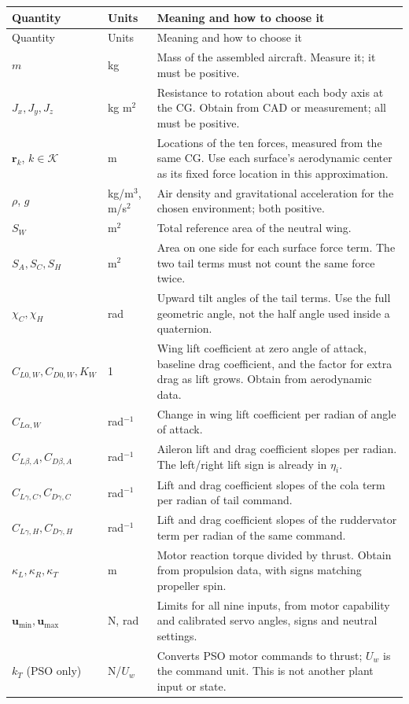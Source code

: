\documentclass[11pt,a4paper]{article}
\numberwithin{equation}{section}
\newcommand{\vect}[1]{\boldsymbol{#1}}
\begin{document}
\small
\begin{longtable}{p{}p{}p{}}
\hline
Quantity & Units & Meaning and how to choose it \\
\hline
\endfirsthead
\hline
Quantity & Units & Meaning and how to choose it \\
\hline
\endhead
$m$ & kg & Mass of the assembled aircraft. Measure it; it must be positive. \\
$J_x,J_y,J_z$ & kg m$^2$ & Resistance to rotation about each body axis at the CG. Obtain from CAD or measurement; all must be positive. \\
$\vect r_k$, $k\in\mathcal K$ & m & Locations of the ten forces, measured from the same CG. Use each surface's aerodynamic center as its fixed force location in this approximation. \\
$\rho$, $g$ & kg/m$^3$, m/s$^2$ & Air density and gravitational acceleration for the chosen environment; both positive. \\
$S_W$ & m$^2$ & Total reference area of the neutral wing. \\
$S_A,S_C,S_H$ & m$^2$ & Area on one side for each surface force term. The two tail terms must not count the same force twice. \\
$\chi_C,\chi_H$ & rad & Upward tilt angles of the tail terms. Use the full geometric angle, not the half angle used inside a quaternion. \\
$C_{L0,W},C_{D0,W},K_W$ & 1 & Wing lift coefficient at zero angle of attack, baseline drag coefficient, and the factor for extra drag as lift grows. Obtain from aerodynamic data. \\
$C_{L\alpha,W}$ & rad$^{-1}$ & Change in wing lift coefficient per radian of angle of attack. \\
$C_{L\beta,A},C_{D\beta,A}$ & rad$^{-1}$ & Aileron lift and drag coefficient slopes per radian. The left/right lift sign is already in $\eta_i$. \\
$C_{L\gamma,C},C_{D\gamma,C}$ & rad$^{-1}$ & Lift and drag coefficient slopes of the cola term per radian of tail command. \\
$C_{L\gamma,H},C_{D\gamma,H}$ & rad$^{-1}$ & Lift and drag coefficient slopes of the ruddervator term per radian of the same command. \\
$\kappa_L,\kappa_R,\kappa_T$ & m & Motor reaction torque divided by thrust. Obtain from propulsion data, with signs matching propeller spin. \\
$\vect u_{\min},\vect u_{\max}$ & N, rad & Limits for all nine inputs, from motor capability and calibrated servo angles, signs and neutral settings. \\
$k_T$ (PSO only) & N/$U_w$ & Converts PSO motor commands to thrust; $U_w$ is the command unit. This is not another plant input or state. \\
\hline
\end{longtable}
\end{document}
